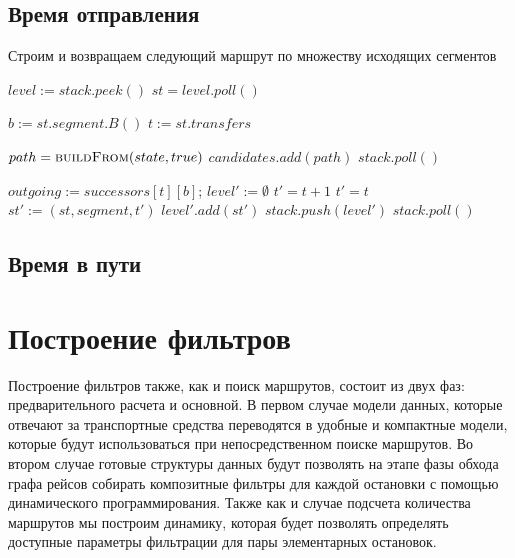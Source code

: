 \subsection{Время отправления}
\begin{algorithm}[!h]
	\caption{Строим и возвращаем следующий маршрут по множеству исходящих сегментов}\label{lst5}
	\begin{algorithmic}
			\State $level := stack.peek()$ 
				\State $st = level.poll()$ 
				
				\State $b := st.segment.B()$
				\State $t := st.transfers$
				
				 
				\State $path = \Call{buildFrom}{state, true}$ 
				\State $candidates.add(path)$ 
				\State $stack.poll()$
				\EndIf
				\EndIf
				
				\State $outgoing := successors[t][b]$;
				\State $level' := \emptyset$ 
				\State $t' = t + 1$
				\Else
				\State $t' = t$
				\EndIf
				\State $st' := (st, segment, t')$
				\State $level'.add(st')$
				\EndFor
				\State $stack.push(level')$
				\EndIf
			\Else
				\State $stack.poll()$ 
			\EndIf
		\EndWhile
		\EndFunction
	\end{algorithmic}
\end{algorithm}

\FloatBarrier
\subsection{Время в пути}

\section{Построение фильтров}
Построение фильтров также, как и поиск маршрутов, состоит из двух фаз: предварительного расчета и основной. В первом случае модели данных, которые отвечают за транспортные средства переводятся в удобные и компактные модели, которые будут использоваться при непосредственном поиске маршрутов. Во втором случае готовые структуры данных будут позволять на этапе фазы обхода графа рейсов собирать композитные фильтры для каждой остановки с помощью динамического программирования. Также как и случае подсчета количества маршрутов мы построим динамику, которая будет позволять определять доступные параметры фильтрации для пары элементарных остановок.

